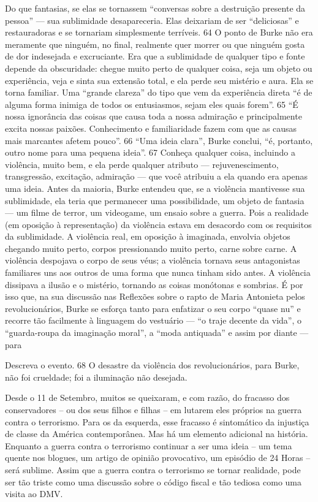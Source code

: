 Do que fantasias, se elas se tornassem “conversas sobre a destruição presente da pessoa” — sua sublimidade desapareceria. Elas deixariam de ser “deliciosas” e restauradoras e se tornariam simplesmente terríveis. {\color{blue}64} O ponto de Burke não era meramente que ninguém, no final, realmente quer morrer ou que ninguém gosta de dor indesejada e excruciante. Era que a sublimidade de qualquer tipo e fonte depende da obscuridade: chegue muito perto de qualquer coisa, seja um objeto ou experiência, veja e sinta sua extensão total, e ela perde seu mistério e aura. Ela se torna familiar. Uma “grande clareza” do tipo que vem da experiência direta “é de alguma forma inimiga de todos os entusiasmos, sejam eles quais forem”. {\color{blue}65} “É nossa ignorância das coisas que causa toda a nossa admiração e principalmente excita nossas paixões. Conhecimento e familiaridade fazem com que as causas mais marcantes afetem pouco”. {\color{blue}66} “Uma ideia clara”, Burke conclui, “é, portanto, outro nome para uma pequena ideia”. {\color{blue}67} Conheça qualquer coisa, incluindo a violência, muito bem, e ela perde qualquer atributo — rejuvenescimento, transgressão, excitação, admiração — que você atribuiu a ela quando era apenas uma ideia. Antes da maioria, Burke entendeu que, se a violência mantivesse sua sublimidade, ela teria que permanecer uma possibilidade, um objeto de fantasia — um filme de terror, um videogame, um ensaio sobre a guerra. Pois a realidade (em oposição à representação) da violência estava em desacordo com os requisitos da sublimidade. A violência real, em oposição à imaginada, envolvia objetos chegando muito perto, corpos pressionando muito perto, carne sobre carne. A violência despojava o corpo de seus véus; a violência tornava seus antagonistas familiares uns aos outros de uma forma que nunca tinham sido antes. A violência dissipava a ilusão e o mistério, tornando as coisas monótonas e sombrias. É por isso que, na sua discussão nas Reflexões sobre o rapto de Maria Antonieta pelos revolucionários, Burke se esforça tanto para enfatizar o seu corpo “quase nu” e recorre tão facilmente à linguagem do vestuário — “o traje decente da vida”, o “guarda-roupa da imaginação moral”, a “moda antiquada” e assim por diante — para
 \par 
Descreva o evento. {\color{blue}68} O desastre da violência dos revolucionários, para Burke, não foi crueldade; foi a iluminação não desejada.
 \par 
Desde o {\color{blue}11} de Setembro, muitos se queixaram, e com razão, do fracasso dos conservadores – ou dos seus filhos e filhas – em lutarem eles próprios na guerra contra o terrorismo. Para os da esquerda, esse fracasso é sintomático da injustiça de classe da América contemporânea. Mas há um elemento adicional na história. Enquanto a guerra contra o terrorismo continuar a ser uma ideia – um tema quente nos blogues, um artigo de opinião provocativo, um episódio de {\color{blue}24} Horas – será sublime. Assim que a guerra contra o terrorismo se tornar realidade, pode ser tão triste como uma discussão sobre o código fiscal e tão tediosa como uma visita ao DMV.